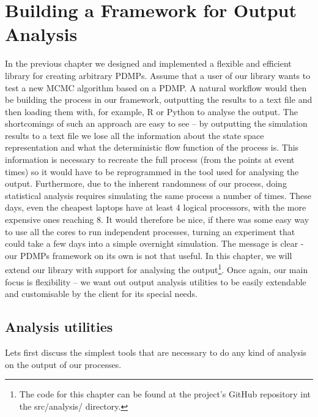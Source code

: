 \documentclass[report.tex]{subfiles}
\begin{document}
\chapter{Building a Framework for Output Analysis}
\label{output-analysis-framework}

In the previous chapter we designed and implemented a flexible and efficient
library for creating arbitrary PDMPs.
Assume that a user of our library wants to test a new MCMC algorithm based on
a PDMP.
A natural workflow would then be building the process in our framework,
outputting the results to a text file and then loading them with, for example,
R or Python to analyse the output.
The shortcomings of such an approach are easy to see --
by outputting the simulation results to a text file we lose all the information
about the state space representation and what the deterministic flow function of the
process is.
This information is necessary to recreate the full process (from the points at event times)
so it would have to be reprogrammed in the tool used for analysing the output.
Furthermore, due to the inherent randomness of our process, doing statistical
analysis requires simulating the same process a number of times.
These days, even the cheapest laptops have at least 4 logical processors, with the more
expensive ones reaching 8.
It would therefore be nice, if there was some easy way to use all the cores to run
independent processes, turning an experiment that could take a few days into a
simple overnight simulation.
The message is clear - our PDMPs framework on its own is not that useful.
In this chapter, we will extend our library with support for analysing the
output\footnote{The code for this chapter can be found at the project's GitHub
repository int the src/analysis/ directory.}.
Once again, our main focus is flexibility -- we want out output analysis utilities
to be easily extendable and customisable by the client for its special needs.

\section{Analysis utilities}
Lets first discuss the simplest tools that are necessary to do any kind of analysis
on the output of our processes.
\end{document}
